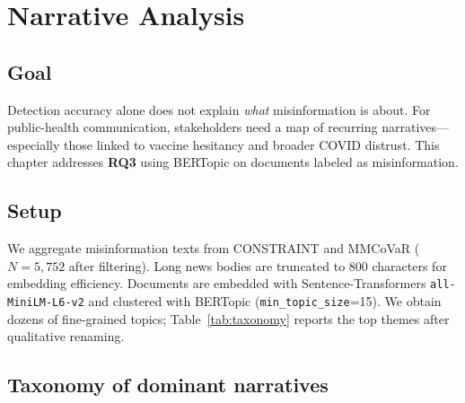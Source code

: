 \chapter{Narrative Analysis}
\label{ch:narr}

\section{Goal}

Detection accuracy alone does not explain \emph{what} misinformation is about.
For public-health communication, stakeholders need a map of recurring narratives---especially those linked to vaccine hesitancy and broader COVID distrust.
This chapter addresses \textbf{RQ3} using BERTopic on documents labeled as misinformation.

\section{Setup}

We aggregate misinformation texts from CONSTRAINT and MMCoVaR ($N=5{,}752$ after filtering).
Long news bodies are truncated to 800 characters for embedding efficiency.
Documents are embedded with Sentence-Transformers \texttt{all-MiniLM-L6-v2} and clustered with BERTopic (\texttt{min\_topic\_size}=15).
We obtain dozens of fine-grained topics; Table~\ref{tab:taxonomy} reports the top themes after qualitative renaming.

\section{Taxonomy of dominant narratives}

